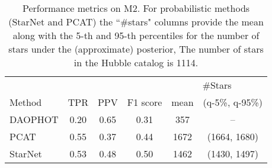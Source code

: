 
\begin{table}[!tb]
\centering
\caption{Performance metrics on M2.
For probabilistic methods (StarNet and PCAT)
the ``\#stars" columns provide the mean along with the 5-th and 95-th percentiles
for the number of stars under the (approximate) posterior,
The number of stars in the Hubble catalog is 1114. }
\label{tab:summary_stats}
\begin{tabular}{l|ccc|cc}
\toprule
& & & & \multicolumn{2}{c}{\#Stars} \\
     Method &   TPR &   PPV &  F1 score &  mean & (q-5\%, q-95\%)\\
\midrule
    DAOPHOT &  0.20 &  0.65 &      0.31 &     357 & -- \\
       PCAT &  0.55 &  0.37 &      0.44 &    1672 & (1664, 1680)\\
 StarNet &  0.53 &  0.48 &      0.50 &    1462 & (1430, 1497)\\
\bottomrule
\end{tabular}
\end{table}
